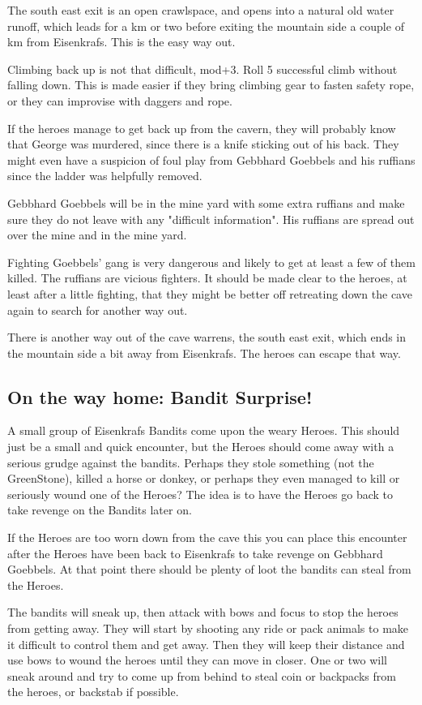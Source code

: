 The south east exit is an open crawlspace, and opens into a natural old water runoff, which leads for a km or two before exiting the mountain side a couple of km from Eisenkrafs. This is the easy way out.

Climbing back up is not that difficult, mod+3. Roll 5 successful climb without falling down. This is made easier if they bring climbing gear to fasten safety rope, or they can improvise with daggers and rope.

If the heroes manage to get back up from the cavern, they will probably know that George was murdered, since there is a knife sticking out of his back. They might even have a suspicion of foul play from Gebbhard Goebbels and his ruffians since the ladder was helpfully removed.

Gebbhard Goebbels will be in the mine yard with some extra ruffians and make sure they do not leave with any "difficult information". His ruffians are spread out over the mine and in the mine yard.

Fighting Goebbels' gang is very dangerous and likely to get at least a few of them killed. The ruffians are vicious fighters. It should be made clear to the heroes, at least after a little fighting, that they might be better off retreating down the cave again to search for another way out.

There is another way out of the cave warrens, the south east exit, which ends in the mountain side a bit away from Eisenkrafs. The heroes can escape that way.


\subsection*{On the way home: Bandit Surprise!}
A small group of Eisenkrafs Bandits come upon the weary Heroes. This should just be a small and quick encounter, but the Heroes should come away with a serious grudge against the bandits. Perhaps they stole something (not the GreenStone), killed a horse or donkey, or perhaps they even managed to kill or seriously wound one of the Heroes? The idea is to have the Heroes go back to take revenge on the Bandits later on.

If the Heroes are too worn down from the cave this you can place this encounter after the Heroes have been back to Eisenkrafs to take revenge on Gebbhard Goebbels. At that point there should be plenty of loot the bandits can steal from the Heroes.

The bandits will sneak up, then attack with bows and focus to stop the heroes from getting away. They will start by shooting any ride or pack animals to make it difficult to control them and get away. Then they will keep their distance and use bows to wound the heroes until they can move in closer.
One or two will sneak around and try to come up from behind to steal coin or backpacks from the heroes, or backstab if possible.







